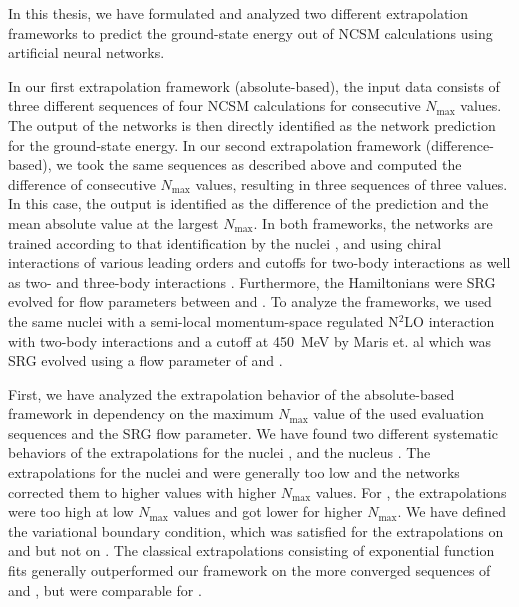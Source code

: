 In this thesis, we have formulated and analyzed two different extrapolation frameworks to predict the ground-state energy out of NCSM calculations using artificial neural networks.

In our first extrapolation framework (absolute-based), the input data consists of three different sequences of four NCSM calculations for consecutive $N_\mathrm{max}$ values. The output of the networks is then directly identified as the network prediction for the ground-state energy. In our second extrapolation framework (difference-based), we took the same sequences as described above and computed the difference of consecutive $N_\mathrm{max}$ values, resulting in three sequences of three values. In this case, the output is identified as the difference of the prediction and the mean absolute value at the largest $N_\mathrm{max}$. In both frameworks, the networks are trained according to that identification by the nuclei ,  and  using chiral interactions of various leading orders and cutoffs for two-body interactions \cite{entemmachleidt} as well as two- and three-body interactions \cite{HUTHER2020135651}. Furthermore, the Hamiltonians were SRG evolved for flow parameters between  and . To analyze the frameworks, we used the same nuclei with a semi-local momentum-space regulated N$^{2}$LO interaction with two-body interactions and a cutoff at \SI{450}{\mega\electronvolt} by Maris et. al \cite{smsquelle} which was SRG evolved using a flow parameter of  and .

First, we have analyzed the extrapolation behavior of the absolute-based framework in dependency on the maximum $N_\mathrm{max}$ value of the used evaluation sequences and the SRG flow parameter. We have found two different systematic behaviors of the extrapolations for the nuclei ,  and the nucleus . The extrapolations for the nuclei  and  were generally too low and the networks corrected them to higher values with higher $N_\mathrm{max}$ values. For , the extrapolations were too high at low $N_\mathrm{max}$ values and got lower for higher $N_\mathrm{max}$. We have defined the variational boundary condition, which was satisfied for the extrapolations on  and  but not on . The classical extrapolations consisting of exponential function fits generally outperformed our framework on the more converged sequences of  and , but were comparable for .

